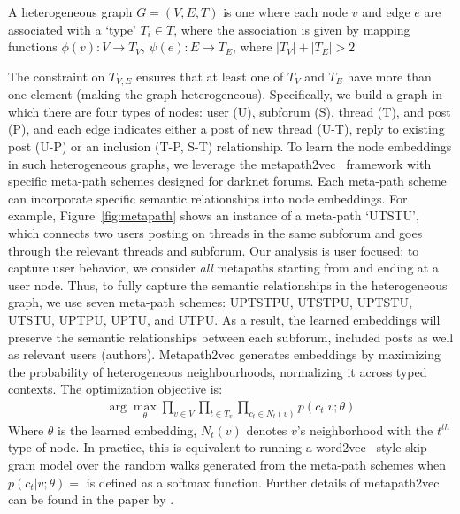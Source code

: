 \begin{definition}
A heterogeneous graph $G = (V, E, T)$ is one where each node $v$ and edge $e$ are associated with a `type' $T_i \in T$, where the association is given by mapping functions $\phi(v): V \rightarrow T_V$, $\psi(e): E \rightarrow T_E$, where $|T_V| + |T_E| > 2$
\end{definition}


The constraint on $T_{V,E}$ ensures that at least one of $T_V$ and $T_E$ have more than one element (making the graph heterogeneous). Specifically, we build a graph in which there are four types of nodes: user (U), subforum (S), thread (T), and post (P), and each edge indicates either a post of new thread (U-T), reply to existing post (U-P) or an inclusion (T-P, S-T) relationship.
To learn the node embeddings in such heterogeneous graphs, we leverage the metapath2vec~\cite{dong2017metapath2vec} framework with specific meta-path schemes designed for darknet forums. 
Each meta-path scheme can incorporate specific semantic relationships into node embeddings. 
For example, Figure~\ref{fig:metapath} shows an instance of a meta-path ‘UTSTU’, which connects two users posting on threads in the same subforum and goes through the relevant threads and subforum.
Our analysis is user focused; to capture user behavior, we consider \emph{all} metapaths starting from and ending at a user node. Thus, to fully capture the semantic relationships in the heterogeneous graph, we use seven meta-path schemes: UPTSTPU, UTSTPU, UPTSTU, UTSTU, UPTPU, UPTU, and UTPU. As a result, the learned embeddings will preserve the semantic relationships between each subforum, included posts as well as relevant users (authors). 
Metapath2vec generates embeddings by maximizing the probability of heterogeneous neighbourhoods, normalizing it across typed contexts.
The optimization objective is:
\begin{align*}
            \arg\max\limits_\theta \prod\limits_{v\in V} \prod\limits_{t\in T_v} \prod\limits_{c_t \in N_t(v)} p(c_t|v; \theta)
\end{align*}
Where $\theta$ is the learned embedding, $N_t(v)$ denotes $v$'s neighborhood with the $t^{th}$ type of node. 
In practice, this is equivalent to running a word2vec~\cite{mikolov2013efficient} style skip gram model over the random walks generated from the meta-path schemes when $p(c_t|v; \theta) = $ is defined as a softmax function. Further details of metapath2vec can be found in the paper by \citet{dong2017metapath2vec}.
